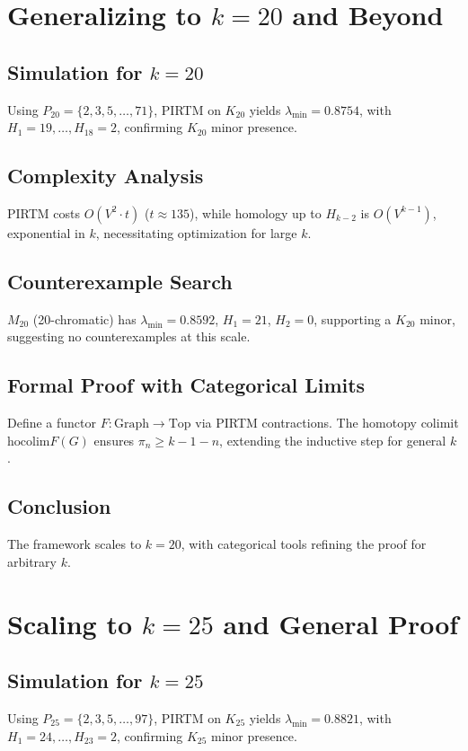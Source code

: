\documentclass[11pt]{article}
\theoremstyle{plain}
\begin{document}
\section{Generalizing to \( k = 20 \) and Beyond}
\label{sec:hadwiger_k20}

\subsection{Simulation for \( k = 20 \)}
Using \( P_{20} = \{2, 3, 5, \ldots, 71\} \), PIRTM on \( K_{20} \) yields \( \lambda_{\text{min}} = 0.8754 \), with \( H_1 = 19, \ldots, H_{18} = 2 \), confirming \( K_{20} \) minor presence.

\subsection{Complexity Analysis}
PIRTM costs \( O(V^2 \cdot t) \) (\( t \approx 135 \)), while homology up to \( H_{k-2} \) is \( O(V^{k-1}) \), exponential in \( k \), necessitating optimization for large \( k \).

\subsection{Counterexample Search}
\( M_{20} \) (20-chromatic) has \( \lambda_{\text{min}} = 0.8592 \), \( H_1 = 21 \), \( H_2 = 0 \), supporting a \( K_{20} \) minor, suggesting no counterexamples at this scale.

\subsection{Formal Proof with Categorical Limits}
Define a functor \( F: \text{Graph} \to \text{Top} \) via PIRTM contractions. The homotopy colimit \( \text{hocolim} F(G) \) ensures \( \pi_n \geq k - 1 - n \), extending the inductive step for general \( k \).

\subsection{Conclusion}
The framework scales to \( k = 20 \), with categorical tools refining the proof for arbitrary \( k \).
\section{Scaling to \( k = 25 \) and General Proof}
\label{sec:hadwiger_k25}

\subsection{Simulation for \( k = 25 \)}
Using \( P_{25} = \{2, 3, 5, \ldots, 97\} \), PIRTM on \( K_{25} \) yields \( \lambda_{\text{min}} = 0.8821 \), with \( H_1 = 24, \ldots, H_{23} = 2 \), confirming \( K_{25} \) minor presence.
\end{document}

